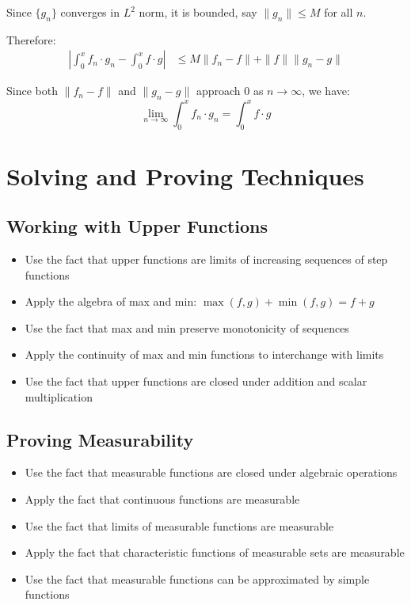 Since $\{g_n\}$ converges in $L^2$ norm, it is bounded, say $\| g_n \| \leq M$ for all $n$.

Therefore:
\begin{align*}
\left|\int_0^x f_n \cdot g_n - \int_0^x f \cdot g\right| &\leq M \| f_n - f \| + \| f \| \| g_n - g \|
\end{align*}

Since both $\| f_n - f \|$ and $\| g_n - g \|$ approach 0 as $n \to \infty$, we have:
\[\lim_{n \to \infty} \int_0^x f_n \cdot g_n = \int_0^x f \cdot g\]

\section{Solving and Proving Techniques}

\subsection*{Working with Upper Functions}
\begin{itemize}
\item Use the fact that upper functions are limits of increasing sequences of step functions
\item Apply the algebra of max and min: $\max(f,g) + \min(f,g) = f + g$
\item Use the fact that max and min preserve monotonicity of sequences
\item Apply the continuity of max and min functions to interchange with limits
\item Use the fact that upper functions are closed under addition and scalar multiplication
\end{itemize}

\subsection*{Proving Measurability}
\begin{itemize}
\item Use the fact that measurable functions are closed under algebraic operations
\item Apply the fact that continuous functions are measurable
\item Use the fact that limits of measurable functions are measurable
\item Apply the fact that characteristic functions of measurable sets are measurable
\item Use the fact that measurable functions can be approximated by simple functions
\end{itemize}

